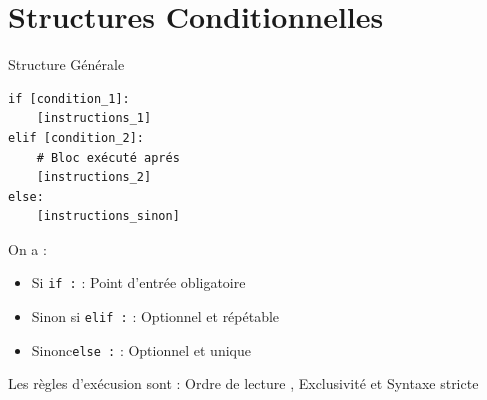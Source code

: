 \section{Structures Conditionnelles}
Structure Générale

\begin{verbatim}
if [condition_1]:
    [instructions_1]
elif [condition_2]:
    # Bloc exécuté aprés
    [instructions_2]
else:
    [instructions_sinon]
\end{verbatim}

On a :

\begin{itemize}
\item Si \texttt{if :} : Point d'entrée obligatoire
\item Sinon si \texttt{elif :} : Optionnel et répétable
\item Sinonc\texttt{else :} : Optionnel et unique
\end{itemize}

Les règles d'exécusion sont : Ordre de lecture , Exclusivité et Syntaxe stricte